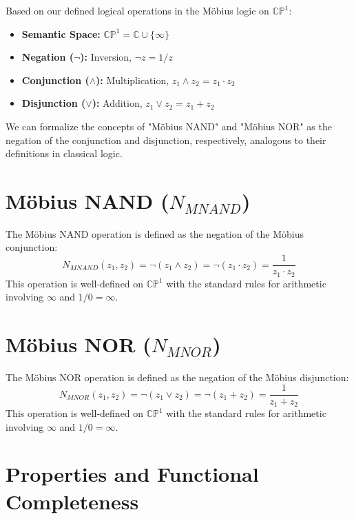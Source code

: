 














	Based on our defined logical operations in the M\"{o}bius logic on $\mathbb{CP}^1$:
	\begin{itemize}
		\item \textbf{Semantic Space:} $\mathbb{CP}^1 = \mathbb{C} \cup \{\infty\}$
		\item \textbf{Negation ($\neg$):} Inversion, $\neg z = 1/z$
		\item \textbf{Conjunction ($\wedge$):} Multiplication, $z_1 \wedge z_2 = z_1 \cdot z_2$
		\item \textbf{Disjunction ($\vee$):} Addition, $z_1 \vee z_2 = z_1 + z_2$
	\end{itemize}
	We can formalize the concepts of "M\"{o}bius NAND" and "M\"{o}bius NOR" as the negation of the conjunction and disjunction, respectively, analogous to their definitions in classical logic.

	\section{Möbius NAND ($N_{MNAND}$)}

	The M\"{o}bius NAND operation is defined as the negation of the M\"{o}bius conjunction:
	$$N_{MNAND}(z_1, z_2) = \neg(z_1 \wedge z_2) = \neg(z_1 \cdot z_2) = \frac{1}{z_1 \cdot z_2}$$
	This operation is well-defined on $\mathbb{CP}^1$ with the standard rules for arithmetic involving $\infty$ and $1/0 = \infty$.

	\section{Möbius NOR ($N_{MNOR}$)}

	The M\"{o}bius NOR operation is defined as the negation of the M\"{o}bius disjunction:
	$$N_{MNOR}(z_1, z_2) = \neg(z_1 \vee z_2) = \neg(z_1 + z_2) = \frac{1}{z_1 + z_2}$$
	This operation is well-defined on $\mathbb{CP}^1$ with the standard rules for arithmetic involving $\infty$ and $1/0 = \infty$.

	\section{Properties and Functional Completeness}

